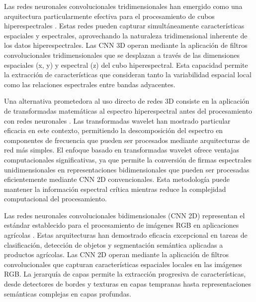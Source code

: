 Las redes neuronales convolucionales tridimensionales han emergido como una arquitectura particularmente efectiva para el procesamiento de cubos hiperespectrales \cite{Zhong}. Estas redes pueden capturar simultáneamente características espaciales y espectrales, aprovechando la naturaleza tridimensional inherente de los datos hiperespectrales. Las CNN 3D operan mediante la aplicación de filtros convolucionales tridimensionales que se desplazan a través de las dimensiones espaciales (x, y) y espectral (z) del cubo hiperespectral. Esta capacidad permite la extracción de características que consideran tanto la variabilidad espacial local como las relaciones espectrales entre bandas adyacentes.

\vspace{5mm}

Una alternativa prometedora al uso directo de redes 3D consiste en la aplicación de transformadas matemáticas al espectro hiperespectral antes del procesamiento con redes neuronales \cite{agriengineering6040225}. Las transformadas wavelet han mostrado particular eficacia en este contexto, permitiendo la descomposición del espectro en componentes de frecuencia que pueden ser procesados mediante arquitecturas de red más simples. El enfoque basado en transformadas wavelet ofrece ventajas computacionales significativas, ya que permite la conversión de firmas espectrales unidimensionales en representaciones bidimensionales que pueden ser procesadas eficientemente mediante CNN 2D convencionales. Esta metodología puede mantener la información espectral crítica mientras reduce la complejidad computacional del procesamiento.

\vspace{5mm}

Las redes neuronales convolucionales bidimensionales (CNN 2D) representan el estándar establecido para el procesamiento de imágenes RGB en aplicaciones agrícolas \cite{FERENTINOS2018311}. Estas arquitecturas han demostrado eficacia excepcional en tareas de clasificación, detección de objetos y segmentación semántica aplicadas a productos agrícolas. Las CNN 2D operan mediante la aplicación de filtros convolucionales que capturan características espaciales locales en las imágenes RGB. La jerarquía de capas permite la extracción progresiva de características, desde detectores de bordes y texturas en capas tempranas hasta representaciones semánticas complejas en capas profundas.


\vspace{5mm}

